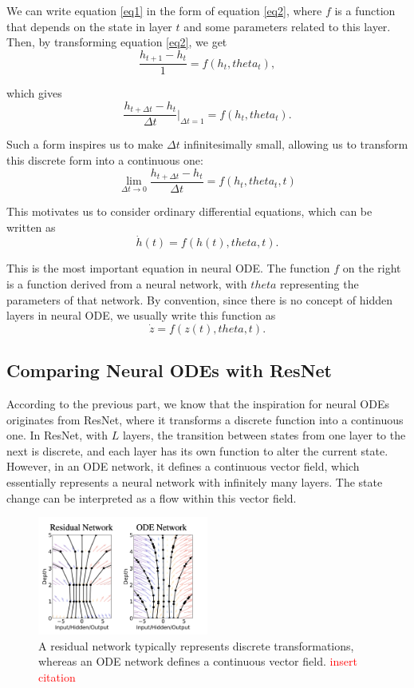 \documentclass[a4paper,11pt,titlepage]{article}
\def\theta{theta}%
\theoremstyle{definition}
\theoremstyle{plain}
\theoremstyle{remark}
\begin{document}
We can write equation \ref{eq1} in the form of equation \ref{eq2}, where $f$ is a function that depends on the state in layer $t$ and some parameters related to this layer. Then, by transforming equation \ref{eq2}, we get
$$\frac{h_{t+1} - h_t }{1}= f(h_t, \theta_t),$$

which gives
$$\frac{h_{t+\Delta t} - h_t }{\Delta t}\Bigg|_{\Delta t=1}= f(h_t, \theta_t).$$

Such a form inspires us to make $\Delta t$ infinitesimally small, allowing us to transform this discrete form into a continuous one:
$$\lim_{\Delta t\to 0}\frac{h_{t+\Delta t} - h_t }{\Delta t}= f(h_t, \theta_t,t)$$

This motivates us to consider ordinary differential equations, which can be written as
$$\dot{h}(t)=f(h(t),\theta,t).$$

This is the most important equation in neural ODE. The function $f$ on the right is a function derived from a neural network, with $\theta$ representing the parameters of that network. By convention, since there is no concept of hidden layers in neural ODE, we usually write this function as
$$\dot{z}= f(z(t), \theta,t).$$

\subsection{Comparing Neural ODEs with ResNet}

According to the previous part, we know that the inspiration for neural ODEs originates from ResNet, where it transforms a discrete function into a continuous one. In ResNet, with $L$ layers, the transition between states from one layer to the next is discrete, and each layer has its own function to alter the current state. However, in an ODE network, it defines a continuous vector field, which essentially represents a neural network with infinitely many layers. The state change can be interpreted as a flow within this vector field.

\begin{figure}[htbp]
    \centering
    \includegraphics[width=0.5\textwidth]{report/figures/ResNetvsODENet.png}
    \caption{A residual network typically represents discrete transformations, whereas an ODE network defines a continuous vector field. \textcolor{red}{insert citation}}
    \label{fig:enter-label}
\end{figure}
\end{document}
